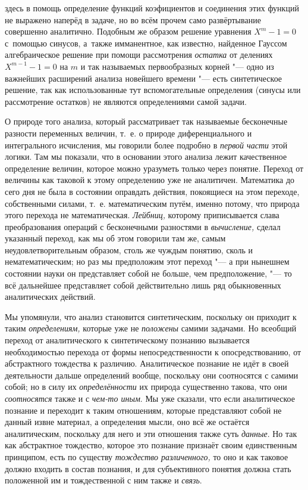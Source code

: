 здесь в помощь определение функций коэфициентов и соединения этих функций не
выражено наперёд в задаче, но во всём прочем само развёртывание совершенно
аналитично. Подобным же образом решение уравнения $X^m-1=0$ с~помощью синусов,
а~также имманентное, как известно, найденное Гауссом алгебраическое
решение при помощи рассмотрения {\em остатка} от делениях $X^{m-1}-1=0$ на $m$
и так называемых первообразных корней "--- одно из важнейших расширений анализа
новейшего времени "--- есть синтетическое решение, так как использованные тут
вспомогательные определения (синусы или рассмотрение остатков) не являются
определениями самой задачи.

О природе того анализа, который рассматривает так называемые
бесконечные разности переменных величин, т.~е. о природе диференциального и
интегрального исчисления, мы говорили более подробно в
{\em первой части} этой
логики. Там мы показали, что в основании этого анализа лежит качественное
определение величин, которое можно уразуметь только через понятие. Переход
от величины как таковой к этому определению уже не аналитичен. Математика
до сего дня не была в состоянии оправдать действия, покоящиеся на этом
переходе, собственными силами, т.~е. математическим путём, именно потому,
что природа этого перехода не математическая.
{\em Лейбниц,} которому
приписывается слава преобразования операций с бесконечными разностями в
{\em вычисление,} сделал
указанный переход, как мы об этом говорили там же, самым
неудовлетворительным образом, столь же чуждым понятию, сколь и
нематематическим; но раз мы предположим этот переход "--- а при
нынешнем состоянии науки он представляет собой не больше, чем
предположение, "--- то всё дальнейшее представляет собой
действительно лишь ряд обыкновенных аналитических действий.

Мы упомянули, что анализ становится синтетическим, поскольку
он приходит к таким {\em определениям,}
которые уже не
{\em положены} самими
задачами. Но всеобщий переход от аналитического к синтетическому познанию
вызывается необходимостью перехода от формы непосредственности к
опосредствованию, от абстрактного тождества к различию. Аналитическое
познание не идёт в своей деятельности дальше определений вообще, поскольку
они соотносятся с самими собой; но в силу их
{\em определённости} их
природа существенно такова, что они
{\em соотносятся} также и
с {\em чем-то иным}.
Мы уже сказали, что если аналитическое познание и переходит к
таким отношениям, которые представляют собой не данный извне материал, а
определения мысли, оно всё же остаётся аналитическим, поскольку для него и
эти отношения также суть {\em данные}.
Но так как абстрактное тождество, которое это познание
признаёт своим единственным принципом, есть по существу
{\em тождество различенного,}
то оно и как таковое должно входить в состав
познания, и для субъективного понятия должна стать положенной им и
тождественной с ним также и
{\em связь}.


